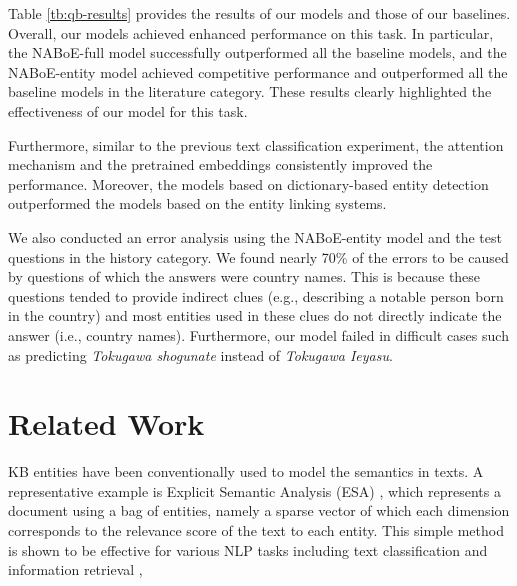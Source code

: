 \documentclass[11pt,a4paper]{article}
\begin{document}
    Table \ref{tb:qb-results} provides the results of our models and those of our baselines.
    Overall, our models achieved enhanced performance on this task.
    In particular, the NABoE-full model successfully outperformed all the baseline models, and the NABoE-entity model achieved competitive performance and outperformed all the baseline models in the literature category.
    These results clearly highlighted the effectiveness of our model for this task.

    Furthermore, similar to the previous text classification experiment, the attention mechanism and the pretrained embeddings consistently improved the performance.
    Moreover, the models based on dictionary-based entity detection outperformed the models based on the entity linking systems.

    We also conducted an error analysis using the NABoE-entity model and the test questions in the history category.
    We found nearly 70\% of the errors to be caused by questions of which the answers were country names.
    This is because these questions tended to provide indirect clues (e.g., describing a notable person born in the country) and most entities used in these clues do not directly indicate the answer (i.e., country names).
    Furthermore, our model failed in difficult cases such as predicting \textit{Tokugawa shogunate} instead of \textit{Tokugawa Ieyasu}.

    \section{Related Work}

    KB entities have been conventionally used to model the semantics in texts.
    A representative example is Explicit Semantic Analysis (ESA) \cite{Gabrilovich2006,Gabrilovich2007}, which represents a document using a bag of entities, namely a sparse vector of which each dimension corresponds to the relevance score of the text to each entity.
    This simple method is shown to be effective for various NLP tasks including text classification \cite{Gabrilovich2006,Gupta:2008:TCK:1620163.1620203,negi-rosner:2013:SemEval-2013} and information retrieval \cite{Egozi:2011:CIR:1961209.1961211,Xiong2016},
\end{document}
